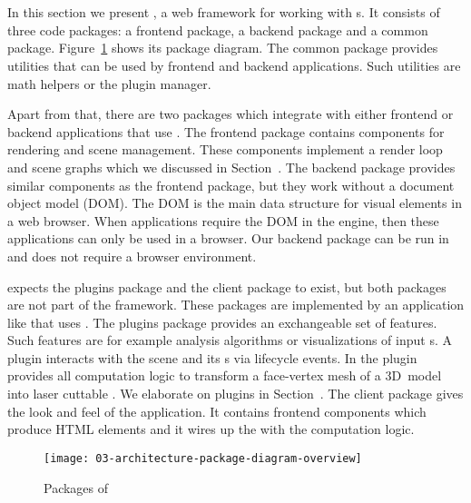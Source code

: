\documentclass[../../ClassicThesis.tex]{subfiles}
\begin{document}

\section{{\convertify}}
\label{sec:framework-convertify}

In this section we present {\convertify}, a web framework
for working with {\threedmodel}s. It consists of three code
packages: a frontend package, a backend package and a common
package. Figure~\ref{fig:platener-package-diagram-overview}
shows its package diagram. The common package provides
utilities that can be used by frontend and backend
applications. Such utilities are math helpers or the plugin
manager.

Apart from that, there are two packages which
integrate with either frontend or backend applications that
use {\convertify}. The frontend package contains components
for rendering and scene management. These components
implement a render loop and scene graphs which we discussed
in Section~. The backend package provides
similar components as the frontend package, but they work
without a document object model (DOM). The DOM is the main
data structure for visual elements in a web browser. When
applications require the DOM in the {\javascript} engine,
then these applications can only be used in a browser. Our
backend package can be run in {\nodejs} and does not require a
browser environment.

{\convertify} expects the plugins package and the client
package to exist, but both packages are not part of the
{\convertify} framework. These packages are implemented by
an application like {\platener} that uses {\convertify}. The
plugins package provides an exchangeable set of features.
Such features are for example analysis algorithms or
visualizations of input {\threedmodel}s. A plugin interacts
with the scene and its {\threedmodel}s via lifecycle events.
In {\platener} the  plugin provides
all computation logic to transform a face-vertex mesh of a
3D~model into laser cuttable {\svgfile}. We elaborate on
plugins in Section~. The
client package gives the look and feel of the application.
It contains frontend components which produce HTML elements
and it wires up the {\userinterface} with the computation
logic.

\begin{figure}[h]
  \centering
  \texttt{[image: 03-architecture-package-diagram-overview]}
  \caption{Packages of {\convertify}}
  \label{fig:platener-package-diagram-overview}
\end{figure}
\end{document}

